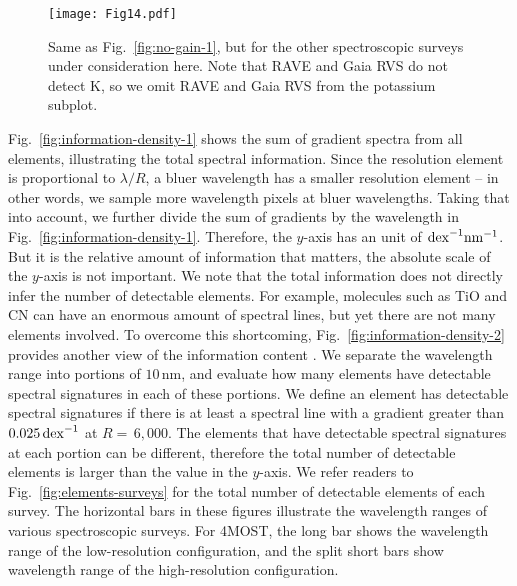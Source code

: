 \documentclass[iop]{emulateapj}
\begin{document}
\begin{CJK*}{UTF8}{gbsn}
\begin{figure*}
\centering
\texttt{[image: Fig14.pdf]}
\caption{Same as Fig.~\ref{fig:no-gain-1}, but for the other spectroscopic surveys under consideration here. Note that RAVE and Gaia RVS do not detect K, so we omit RAVE and Gaia RVS from the potassium subplot.}
\label{fig:no-gain-2}
\end{figure*}

Fig.~\ref{fig:information-density-1} shows the sum of gradient spectra from all elements, illustrating the total spectral information. Since the resolution element is proportional to $\lambda/R$, a bluer wavelength has a smaller resolution element -- in other words, we sample more wavelength pixels at bluer wavelengths. Taking that into account, we further divide the sum of gradients by the wavelength in Fig.~\ref{fig:information-density-1}. Therefore, the $y$-axis has an unit of ${\rm dex}^{-1} {\rm nm}^{-1}$. But it is the relative amount of information that matters, the absolute scale of the $y$-axis is not important. We note that the total information does not directly infer the number of detectable elements. For example, molecules such as TiO and CN can have an enormous amount of spectral lines, but yet there are not many elements involved. To overcome this shortcoming, Fig.~\ref{fig:information-density-2} provides another view of the information content \citep[also see][for a similar analysis]{bla04}. We separate the wavelength range into portions of $10\,$nm, and evaluate how many elements have detectable spectral signatures in each of these portions. We define an element has detectable spectral signatures if there is at least a spectral line with a gradient greater than $0.025 \, {\rm dex}^{-1}$ at $R = \,$6$,$000. The elements that have detectable spectral signatures at each portion can be different, therefore the total number of detectable elements is larger than the value in the $y$-axis. We refer readers to Fig.~\ref{fig:elements-surveys} for the total number of detectable elements of each survey. The horizontal bars in these figures illustrate the wavelength ranges of various spectroscopic surveys. For 4MOST, the long bar shows the wavelength range of the low-resolution configuration, and the split short bars show wavelength range of the high-resolution configuration.


\end{CJK*}
\end{document}
